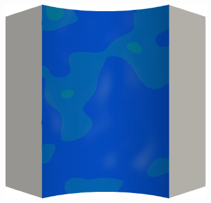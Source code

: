 \begin{figure}[!htbp]
\begin{subfigure}{0.19\textwidth}
  \end{subfigure}
  \hspace{0.06\textwidth}
  \begin{subfigure}{0.19\textwidth}
    \centering
    \includegraphics[width=\textwidth]{Chapter5/figures/spallation/ep.0003}
  \end{subfigure}
  

\end{figure}
